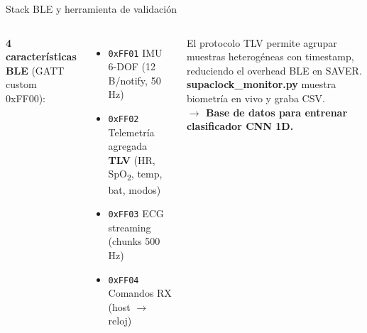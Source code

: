 \documentclass[aspectratio=169, 10pt]{beamer}
\begin{document}
\begin{frame}{Stack BLE y herramienta de validaci\'on}
    \begin{columns}[T]
        \footnotesize
        \textbf{4 caracter\'isticas BLE} (GATT custom 0xFF00):
        \begin{itemize}\itemsep0pt
            \item \texttt{0xFF01} IMU 6-DOF (12 B/notify, 50\,Hz)
            \item \texttt{0xFF02} Telemetr\'ia agregada \textbf{TLV} (HR, SpO\textsubscript{2}, temp, bat, modos)
            \item \texttt{0xFF03} ECG streaming (chunks 500\,Hz)
            \item \texttt{0xFF04} Comandos RX (host $\rightarrow$ reloj)
        \end{itemize}
        \vspace{0.1cm}
        El protocolo TLV permite agrupar muestras heterog\'eneas con timestamp, reduciendo el overhead BLE en SAVER.
        \vspace{0.1cm}
        \scriptsize
        \textbf{supaclock\_monitor.py} muestra biometr\'ia en vivo y graba CSV.\\
        \textbf{$\rightarrow$ Base de datos para entrenar clasificador CNN 1D.}
    \end{columns}
\end{frame}
\end{document}
